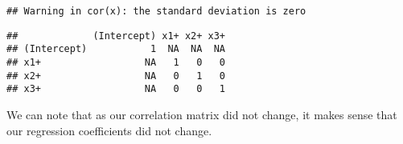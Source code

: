 \documentclass[
]{article}
\begin{document}
\begin{verbatim}
## Warning in cor(x): the standard deviation is zero
\end{verbatim}

\begin{verbatim}
##             (Intercept) x1+ x2+ x3+
## (Intercept)           1  NA  NA  NA
## x1+                  NA   1   0   0
## x2+                  NA   0   1   0
## x3+                  NA   0   0   1
\end{verbatim}

We can note that as our correlation matrix did not change, it makes
sense that our regression coefficients did not change.
\end{document}
